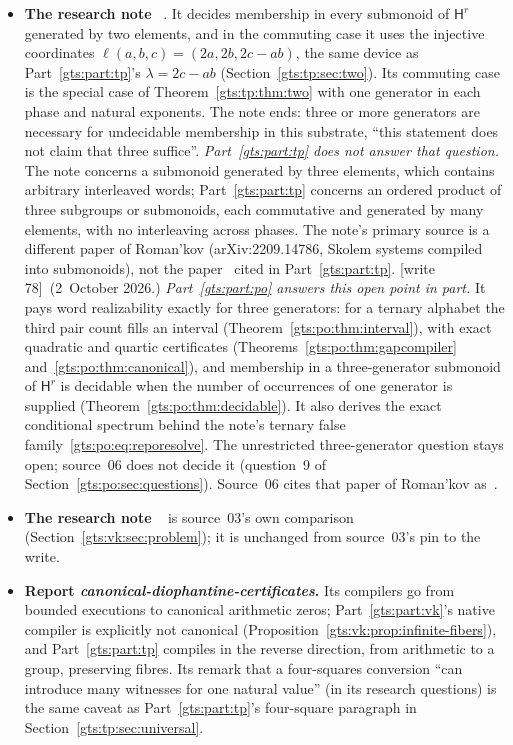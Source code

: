 \documentclass[11pt,letterpaper]{article}
\theoremstyle{definition}
\theoremstyle{remark}
\newcommand{\HH}{\mathsf H}
\newcommand{\wtagb}{\textup{[write 78]}}
\begin{document}
\begin{itemize}
\item \textbf{The research note }~\cite{repo-heis}. It decides membership in every submonoid of $\HH^r$ generated by two elements, and in the commuting case it uses the injective coordinates $\ell(a,b,c)=(2a,2b,2c-ab)$, the same device as Part~\ref{gts:part:tp}'s $\lambda=2c-ab$ (Section~\ref{gts:tp:sec:two}). Its commuting case is the special case of Theorem~\ref{gts:tp:thm:two} with one generator in each phase and natural exponents. The note ends: three or more generators are necessary for undecidable membership in this substrate, ``this statement does not claim that three suffice''. \emph{Part~\ref{gts:part:tp} does not answer that question.} The note concerns a submonoid generated by three elements, which contains arbitrary interleaved words; Part~\ref{gts:part:tp} concerns an ordered product of three subgroups or submonoids, each commutative and generated by many elements, with no interleaving across phases. The note's primary source is a different paper of Roman'kov (arXiv:2209.14786, Skolem systems compiled into submonoids), not the paper~\cite{Romankov} cited in Part~\ref{gts:part:tp}. \wtagb\ (2~October 2026.) \emph{Part~\ref{gts:part:po} answers this open point in part.} It pays word realizability exactly for three generators: for a ternary alphabet the third pair count fills an interval (Theorem~\ref{gts:po:thm:interval}), with exact quadratic and quartic certificates (Theorems~\ref{gts:po:thm:gapcompiler} and~\ref{gts:po:thm:canonical}), and membership in a three-generator submonoid of $\HH^r$ is decidable when the number of occurrences of one generator is supplied (Theorem~\ref{gts:po:thm:decidable}). It also derives the exact conditional spectrum behind the note's ternary false family~\eqref{gts:po:eq:reporesolve}. The unrestricted three-generator question stays open; source~06 does not decide it (question~9 of Section~\ref{gts:po:sec:questions}). Source~06 cites that paper of Roman'kov as~\cite{po-romankov}.
\item \textbf{The research note }~\cite{repo-group} is source~03's own comparison (Section~\ref{gts:vk:sec:problem}); it is unchanged from source~03's pin to the write.
\item \textbf{Report \emph{canonical-diophantine-certificates}.} Its compilers go from bounded executions to canonical arithmetic zeros; Part~\ref{gts:part:vk}'s native compiler is explicitly not canonical (Proposition~\ref{gts:vk:prop:infinite-fibers}), and Part~\ref{gts:part:tp} compiles in the reverse direction, from arithmetic to a group, preserving fibres. Its remark that a four-squares conversion ``can introduce many witnesses for one natural value'' (in its research questions) is the same caveat as Part~\ref{gts:part:tp}'s four-square paragraph in Section~\ref{gts:tp:sec:universal}.

\end{itemize}
\end{document}
